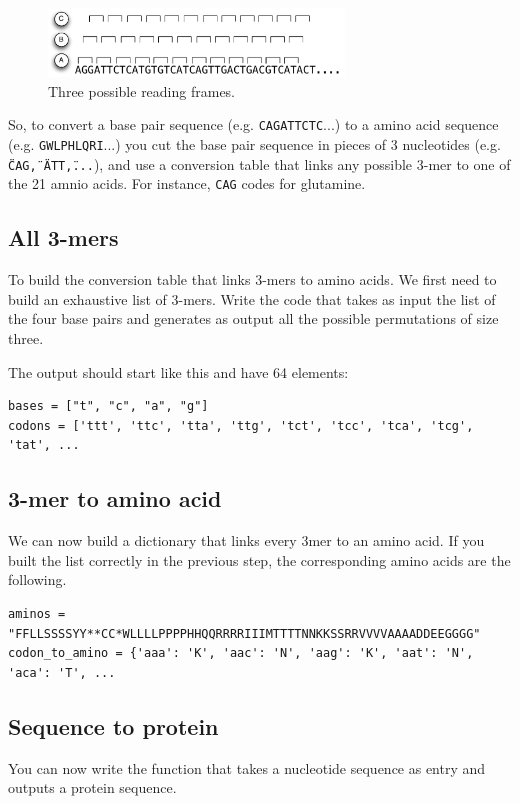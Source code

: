 \documentclass[a4paper,11pt]{article}
\begin{document}
\begin{figure}[h!]
	\centering
	\includegraphics[width=0.7\textwidth]{reading_frame.pdf}
	\caption{Three possible reading frames.}
	\label{fig:gene_distribution_rib}
\end{figure}

So, to convert a base pair sequence (e.g. \texttt{CAGATTCTC}...) to a amino acid sequence (e.g. \texttt{GWLPHLQRI}...) you cut the base pair sequence in pieces of 3 nucleotides (e.g. \texttt{\"CAG\", \"ATT\",...}), and use a conversion table that links any possible 3-mer to one of the 21 amnio acids. For instance, \texttt{CAG} codes for glutamine.

\subsection{All 3-mers}
To build the conversion table that links 3-mers to amino acids. We first need to build an exhaustive list of 3-mers. Write the code that takes as input the list of the four base pairs and generates as output all the possible permutations of size three.
	
The output should start like this and have 64 elements:
	
\begin{verbatim}
bases = ["t", "c", "a", "g"]
codons = ['ttt', 'ttc', 'tta', 'ttg', 'tct', 'tcc', 'tca', 'tcg', 'tat', ...
\end{verbatim}

\subsection{3-mer to amino acid}
We can now build a dictionary that links every 3mer to an amino acid. If you built the list correctly in the previous step, the corresponding amino acids are the following.

\begin{verbatim}
aminos = "FFLLSSSSYY**CC*WLLLLPPPPHHQQRRRRIIIMTTTTNNKKSSRRVVVVAAAADDEEGGGG"
codon_to_amino = {'aaa': 'K', 'aac': 'N', 'aag': 'K', 'aat': 'N', 'aca': 'T', ...
\end{verbatim}

\subsection{Sequence to protein}
You can now write the function that takes a nucleotide sequence as entry and outputs a protein sequence.
\end{document}
